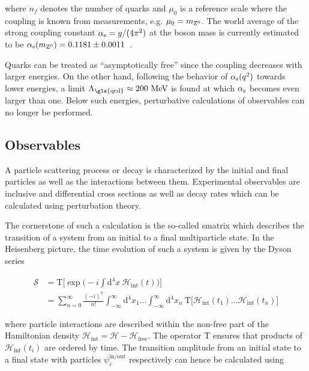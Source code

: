 where $n_f$ denotes the number of quarks and $\mu_{0}$ is a reference scale where the coupling is known from measurements, e.g. $\mu_{0}=m_{{\mathrm{Z}^{0}}}$. The world average of the strong coupling constant ${\alpha_\mathrm{s}}=g/(4\pi^2)$ at the \zboson boson mass is currently estimated to be ${\alpha_\mathrm{s}}(m_{{\mathrm{Z}^{0}}})=0.1181\pm0.0011$~\cite{Olive:2016xmw}. 

Quarks can be treated as ``asymptotically free'' since the coupling decreases with larger energies. On the other hand, following the behavior of ${\alpha_\mathrm{s}}(q^2)$ towards lower energies, a limit $\Lambda_\mathrm{\gls{qcd}}\approx 200~\MeV$ is found at which ${\alpha_\mathrm{s}}$ becomes even larger than one. Below such energies, perturbative calculations of observables can no longer be performed. 



\subsection{Observables}

A particle scattering process or decay is characterized by the initial and final particles as well as the interactions between them. Experimental observables are inclusive and differential cross sections as well as decay rates which can be calculated using perturbation theory. 

The cornerstone of such a calculation is the so-called \gls{smatrix} which describes the transition of a system from an initial to a final multiparticle state. In the Heisenberg picture, the time evolution of such a system is given by the Dyson series

\begin{align}
\mathcal{S}&=\mathrm{T}\Big[\exp\Big(-i\int\mathrm{d}^{4}x~\mathcal{H}_\mathrm{int}(t)\Big)\Big]\\
&=\sum_{n=0}^{\infty}\frac{(-i)^{n}}{n!}\int_{-\infty}^{\infty}\mathrm{d}^{4}x_{1}\ldots \int_{-\infty}^{\infty}\mathrm{d}^{4}x_{n}~\mathrm{T}\Big[\mathcal{H}_\mathrm{int}(t_{1})\ldots\mathcal{H}_\mathrm{int}(t_{n})\Big] \label{eq:theory-dyson-series}
\end{align}

where particle interactions are described within the non-free part of the Hamiltonian density $\mathcal{H}_\mathrm{int}=\mathcal{H}-\mathcal{H}_\mathrm{free}$. The operator $\mathrm{T}$ ensures that products of $\mathcal{H}_\mathrm{int}(t_{i})$ are ordered by time. The transition amplitude from an initial state to a final state with particles $\psi_i^\mathrm{in/out}$ respectively can hence be calculated using

